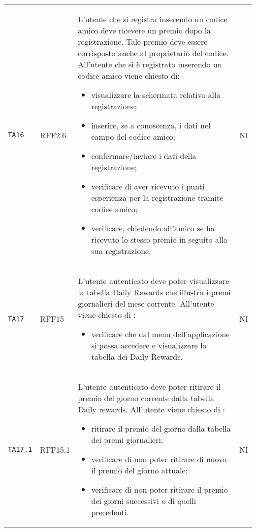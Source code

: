 \begin{longtable}{ >{\centering}p{} >{\centering}p{} >{\centering}p{}
			>{\centering}p{}}
		 \texttt{TA16}	& RFF2.6 & 	L'utente che si registra inserendo un codice amico deve ricevere un premio dopo la registrazione. Tale premio deve essere corrisposto anche al proprietario del codice. All'utente che si è registrato inserendo un codice amico viene chiesto di:
		 \begin{itemize}
		 	\item visualizzare la schermata relativa alla registrazione;
		 	\item inserire, se a conoscenza, i dati nel campo del codice amico;
		 	\item confermare/inviare i dati della registrazione;
		 	\item verificare di aver ricevuto i punti esperienza per la registrazione tramite codice amico;
		 	\item verificare, chiedendo all'amico se ha ricevuto lo stesso premio in seguito alla sua registrazione.
		 \end{itemize}	&	NI	\tabularnewline	
		  \texttt{TA17}	& RFF15	& L'utente autenticato deve poter visualizzare la tabella Daily Rewards che illustra i premi giornalieri del mese corrente. All'utente viene chiesto di :
		 \begin{itemize}
		 	\item verificare che dal menu dell'applicazione si possa accedere e visualizzare la tabella dei Daily Rewards.
		 \end{itemize}	&	NI	\tabularnewline	
	
	 \texttt{TA17.1}	& RFF15.1 &	L'utente autenticato deve poter ritirare il premio del giorno corrente dalla tabella Daily rewards. All'utente viene chiesto di :
		 \begin{itemize}
		 	\item ritirare il premio del giorno dalla tabella dei premi giornalieri;
		 	\item verificare di non poter ritirare di nuovo il premio del giorno attuale;
		 	\item verificare di non poter ritirare il premio dei giorni successivi o di quelli precedenti.
		 \end{itemize}	&	NI	\tabularnewline


\end{longtable}

